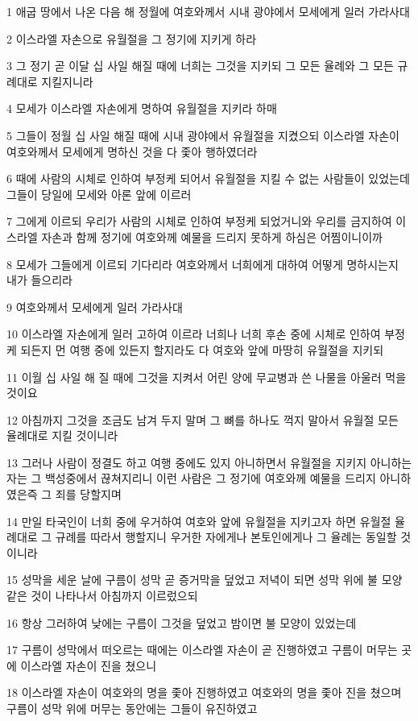 \par 1 애굽 땅에서 나온 다음 해 정월에 여호와께서 시내 광야에서 모세에게 일러 가라사대
\par 2 이스라엘 자손으로 유월절을 그 정기에 지키게 하라
\par 3 그 정기 곧 이달 십 사일 해질 때에 너희는 그것을 지키되 그 모든 율례와 그 모든 규례대로 지킬지니라
\par 4 모세가 이스라엘 자손에게 명하여 유월절을 지키라 하매
\par 5 그들이 정월 십 사일 해질 때에 시내 광야에서 유월절을 지켰으되 이스라엘 자손이 여호와께서 모세에게 명하신 것을 다 좇아 행하였더라
\par 6 때에 사람의 시체로 인하여 부정케 되어서 유월절을 지킬 수 없는 사람들이 있었는데 그들이 당일에 모세와 아론 앞에 이르러
\par 7 그에게 이르되 우리가 사람의 시체로 인하여 부정케 되었거니와 우리를 금지하여 이스라엘 자손과 함께 정기에 여호와께 예물을 드리지 못하게 하심은 어찜이니이까
\par 8 모세가 그들에게 이르되 기다리라 여호와께서 너희에게 대하여 어떻게 명하시는지 내가 들으리라
\par 9 여호와께서 모세에게 일러 가라사대
\par 10 이스라엘 자손에게 일러 고하여 이르라 너희나 너희 후손 중에 시체로 인하여 부정케 되든지 먼 여행 중에 있든지 할지라도 다 여호와 앞에 마땅히 유월절을 지키되
\par 11 이월 십 사일 해 질 때에 그것을 지켜서 어린 양에 무교병과 쓴 나물을 아울러 먹을 것이요
\par 12 아침까지 그것을 조금도 남겨 두지 말며 그 뼈를 하나도 꺽지 말아서 유월절 모든 율례대로 지킬 것이니라
\par 13 그러나 사람이 정결도 하고 여행 중에도 있지 아니하면서 유월절을 지키지 아니하는 자는 그 백성중에서 끊쳐지리니 이런 사람은 그 정기에 여호와께 예물을 드리지 아니하였은즉 그 죄를 당할지며
\par 14 만일 타국인이 너희 중에 우거하여 여호와 앞에 유월절을 지키고자 하면 유월절 율례대로 그 규례를 따라서 행할지니 우거한 자에게나 본토인에게나 그 율례는 동일할 것이니라
\par 15 성막을 세운 날에 구름이 성막 곧 증거막을 덮었고 저녁이 되면 성막 위에 불 모양 같은 것이 나타나서 아침까지 이르렀으되
\par 16 항상 그러하여 낮에는 구름이 그것을 덮었고 밤이면 불 모양이 있었는데
\par 17 구름이 성막에서 떠오르는 때에는 이스라엘 자손이 곧 진행하였고 구름이 머무는 곳에 이스라엘 자손이 진을 쳤으니
\par 18 이스라엘 자손이 여호와의 명을 좇아 진행하였고 여호와의 명을 좇아 진을 쳤으며 구름이 성막 위에 머무는 동안에는 그들이 유진하였고
